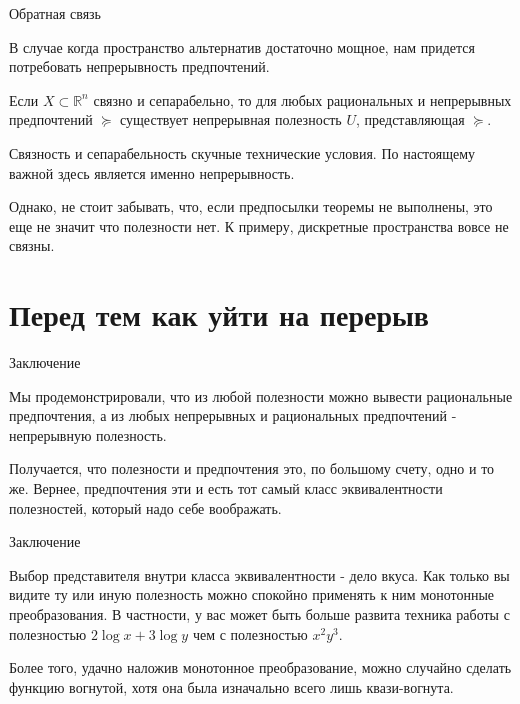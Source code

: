 \documentclass{beamer}
\begin{document}
\begin{frame}{Обратная связь}

В случае когда пространство альтернатив достаточно мощное, нам придется потребовать непрерывность предпочтений. 

\begin{theorem}[Дебре]
Если $X\subset \mathbb{R}^n$ связно и сепарабельно, то для любых рациональных и непрерывных предпочтений $\succcurlyeq$ существует непрерывная полезность $U$, представляющая $\succcurlyeq$.
\end{theorem}

Связность и сепарабельность скучные технические условия. По настоящему важной здесь является именно непрерывность.

Однако, не стоит забывать, что, если предпосылки теоремы не выполнены, это еще не значит что полезности нет. К примеру, дискретные пространства вовсе не связны.

\end{frame}

\section{Перед тем как уйти на перерыв}

\begin{frame}{Заключение}

Мы продемонстрировали, что из любой полезности можно вывести рациональные предпочтения, а из любых непрерывных и рациональных предпочтений - непрерывную полезность.

Получается, что полезности и предпочтения это, по большому счету, одно и то же. Вернее, предпочтения эти и есть тот самый класс эквивалентности полезностей, который надо себе воображать.

\end{frame}

\begin{frame}{Заключение}

Выбор представителя внутри класса эквивалентности - дело вкуса. Как только вы видите ту или иную полезность можно спокойно применять к ним монотонные преобразования. В частности, у вас может быть больше развита техника работы с полезностью $2 \log x + 3 \log y$ чем с полезностью $x^2 y^3.$ 

Более того, удачно наложив монотонное преобразование, можно случайно сделать функцию вогнутой, хотя она была изначально всего лишь квази-вогнута.

\end{frame}
\end{document}
